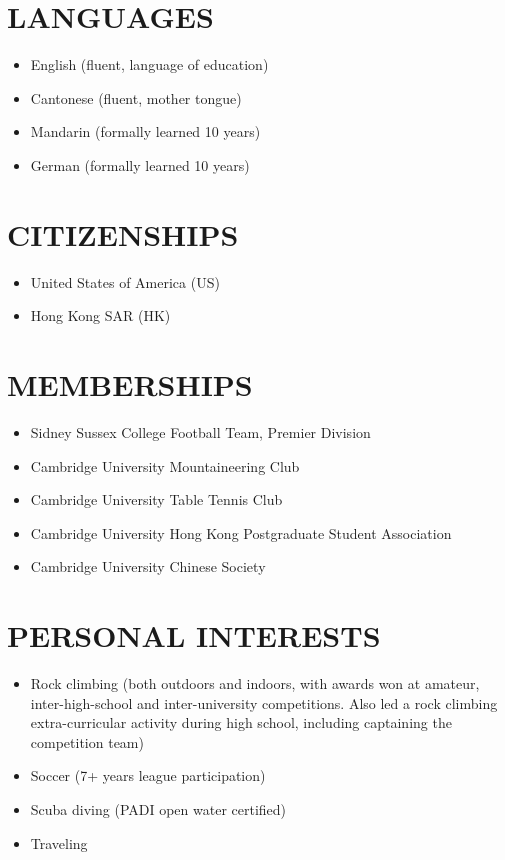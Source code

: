 \documentclass[a4paper,10pt]{extarticle}
\begin{document}
\section*{LANGUAGES}
\begin{itemize}
    \item English (fluent, language of education)

    \item Cantonese (fluent, mother tongue)

    \item Mandarin (formally learned 10 years)

    \item German (formally learned 10 years)
\end{itemize}

\section*{CITIZENSHIPS}
\begin{itemize}
    \item United States of America (US)

    \item Hong Kong SAR (HK)
\end{itemize}




\section*{MEMBERSHIPS}
\begin{itemize}
    \item Sidney Sussex College Football Team, Premier Division

    \item Cambridge University Mountaineering Club

    \item Cambridge University Table Tennis Club

    \item Cambridge University Hong Kong Postgraduate Student Association

    \item Cambridge University Chinese Society
\end{itemize}

\section*{PERSONAL INTERESTS}
\begin{itemize}
    \item Rock climbing (both outdoors and indoors, with awards won at amateur, inter-high-school and inter-university competitions. Also led a rock climbing extra-curricular activity during high school, including captaining the competition team)

    \item Soccer (7+ years league participation)

    \item Scuba diving (PADI open water certified)

    \item Traveling
\end{itemize}
\end{document}

